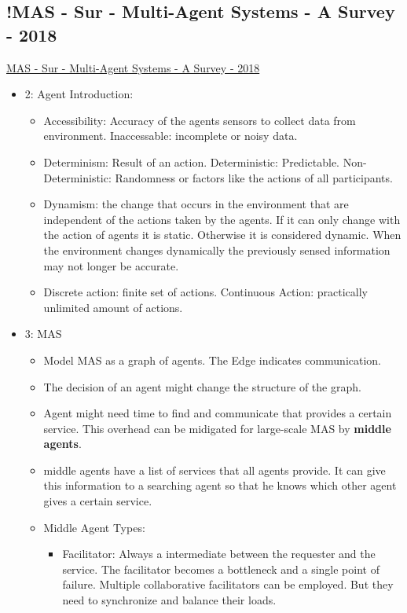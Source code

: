 \subsection{!MAS - Sur - Multi-Agent Systems - A Survey - 2018}
\href{https://ieeexplore.ieee.org/abstract/document/8352646}{MAS - Sur - Multi-Agent Systems - A Survey - 2018}
\begin{itemize}[noitemsep,nolistsep]
	\item 2: Agent Introduction: 
	\begin{itemize}[noitemsep,nolistsep]
		\item Accessibility: Accuracy of the agents sensors to collect data from environment. Inaccessable: incomplete or noisy data.
		\item Determinism: Result of an action. Deterministic: Predictable. Non-Deterministic: Randomness or factors like the actions of all participants.
		\item Dynamism: the change that occurs in the environment that are independent of the actions taken by the agents. If it can only change with the action of agents it is static. Otherwise it is considered dynamic. When the environment changes dynamically the previously sensed information may not longer be accurate.
		\item Discrete action: finite set of actions. Continuous Action: practically unlimited amount of actions.
	\end{itemize}
	\item 3: MAS
	\begin{itemize}[noitemsep,nolistsep]
		\item Model MAS as a graph of agents. The Edge indicates communication.
		\item The decision of an agent might change the structure of the graph.
		\item Agent might need time to find and communicate that provides a certain service. This overhead can be midigated for large-scale MAS by \textbf{middle agents}.
		\item middle agents have a list of services that all agents provide. It can give this information to a searching agent so that he knows which other agent gives a certain service.
		\item Middle Agent Types: 
		\begin{itemize}[noitemsep,nolistsep]
			\item Facilitator: Always a intermediate between the requester and the service. The facilitator becomes a bottleneck and a single point of failure. Multiple collaborative facilitators can be employed. But they need to synchronize and balance their loads. 

\end{itemize}
\end{itemize}
\end{itemize}
